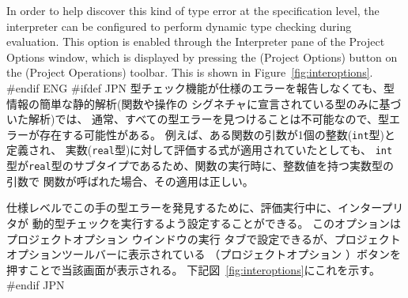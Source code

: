 \documentclass[\pformat,12pt]{article}
\newcommand{\aaa}{\tt }
\newcommand{\guicmd}[1]{{\sf #1}}
\newcommand{\guicmd}[1]{{\gt #1}}
\begin{document}
In order to help discover this kind of type error at the specification
level, the interpreter can be configured to perform dynamic type
checking during evaluation.  This option is enabled through the
\guicmd{Interpreter} pane of the \guicmd{Project Options} window, 
which is displayed by pressing the
(\guicmd{Project Options}) button on the (\guicmd{Project Operations})
toolbar. This is shown in Figure~\ref{fig:interoptions}.
#endif ENG
#ifdef JPN
型チェック機能が仕様のエラーを報告しなくても、型情報の簡単な静的解析(関数や操作の
シグネチャに宣言されている型のみに基づいた解析)では、
通常、すべての型エラーを見つけることは不可能なので、型エラーが存在する可能性がある。
例えば、ある関数の引数が1個の整数({\aaa int}型)と定義され、
実数({\aaa real}型)に対して評価する式が適用されていたとしても、
{\aaa int} 型が{\aaa real}型のサブタイプであるため、関数の実行時に、整数値を持つ実数型の引数で
関数が呼ばれた場合、その適用は正しい。

仕様レベルでこの手の型エラーを発見するために、評価実行中に、インタープリタが
動的型チェックを実行するよう設定することができる。
このオプションは\guicmd{プロジェクトオプション} ウインドウの\guicmd{実行} タブで設定できるが、プロジェクト
オプションツールバーに表示されている 
 （\guicmd{プロジェクトオプション} ）ボタンを押すことで当該画面が表示される。
下記図~\ref{fig:interoptions}にこれを示す。
#endif JPN
\end{document}
